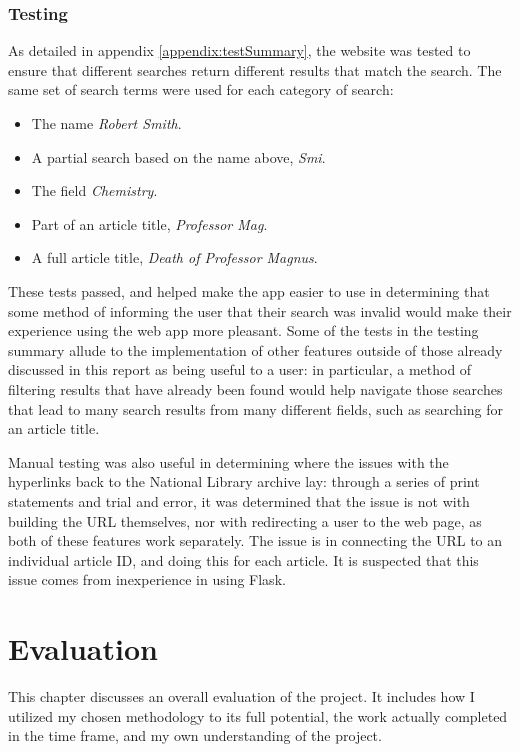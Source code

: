 \documentclass[11pt,a4paper]{book}
\begin{document}
\subsection{Testing}
As detailed in appendix \ref{appendix:testSummary}, the website was tested to ensure that different searches return different results that match the search. The same set of search terms were used for each category of search:
\begin{itemize}
	\item The name \textit{Robert Smith}.
	\item A partial search based on the name above, \textit{Smi}.
	\item The field \textit{Chemistry}.
	\item Part of an article title, \textit{Professor Mag}.
	\item A full article title, \textit{Death of Professor Magnus}.
\end{itemize}
These tests passed, and helped make the app easier to use in determining that some method of informing the user that their search was invalid would make their experience using the web app more pleasant. Some of the tests in the testing summary allude to the implementation of other features outside of those already discussed in this report as being useful to a user: in particular, a method of filtering results that have already been found would help navigate those searches that lead to many search results from many different fields, such as searching for an article title.

Manual testing was also useful in determining where the issues with the hyperlinks back to the National Library archive lay: through a series of print statements and trial and error, it was determined that the issue is not with building the URL themselves, nor with redirecting a user to the web page, as both of these features work separately. The issue is in connecting the URL to an individual article ID, and doing this for each article. It is suspected that this issue comes from inexperience in using Flask.

\chapter{Evaluation}
This chapter discusses an overall evaluation of the project. It includes how I utilized my chosen methodology to its full potential, the work actually completed in the time frame, and my own understanding of the project. 
\end{document}

